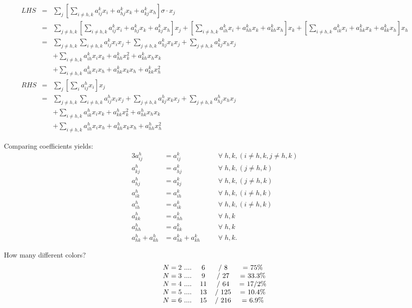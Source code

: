 \begin{eqnarray}
LHS &=& \sum_j \left[ \sum_{i \neq h,k} a^k_{ij} x_i + a^k_{hj} x_k + a^k_{kj} x_h \right] \sigma \cdot x_j \nonumber \\
&=& \sum_{j \neq h,k} \left[ \sum_{i \neq h,k} a^k_{ij} x_i + a^k_{hj} x_k + a^k_{kj} x_h \right] x_j
+ \left[ \sum_{i \neq h,k} a^k_{ih} x_i + a^k_{hh} x_k + a^k_{kh} x_h \right] x_k
+ \left[ \sum_{i \neq h,k} a^k_{ik} x_i + a^k_{hk} x_k + a^k_{kk} x_h \right] x_h \nonumber \\
&=& \sum_{j \neq h,k} \sum_{i \neq h,k} a^k_{ij} x_i x_j + \sum_{j \neq h,k} a^k_{hj} x_k x_j + \sum_{j \neq h,k} a^k_{kj} x_h x_j \nonumber \\
&& + \sum_{i \neq h,k} a^k_{ih} x_i x_k + a^k_{hh} x^2_k + a^k_{kh} x_h x_k \nonumber \\
&& + \sum_{i \neq h,k} a^k_{ik} x_i x_h + a^k_{hk} x_k x_h + a^k_{kk} x^2_h \nonumber \\
RHS &=& \sum_j \left[ \sum_i a_{ij}^h x_i \right] x_j \nonumber \\
&=& \sum_{j \neq h,k} \sum_{i \neq h,k} a^h_{ij} x_i x_j + \sum_{j \neq h,k} a^h_{kj} x_k x_j + \sum_{j \neq h,k} a^h_{hj} x_h x_j \nonumber \\
&& + \sum_{i \neq h,k} a^h_{ik} x_i x_k + a^h_{kk} x^2_k + a^h_{hk} x_h x_k \nonumber \\
&& + \sum_{i \neq h,k} a^h_{ih} x_i x_h + a^h_{kh} x_k x_h + a^h_{hh} x^2_h
\end{eqnarray}

Comparing coefficients yields:
\begin{alignat}{3}
a_{ij}^h &= a_{ij}^k && \forall \; h,k, (i \neq h,k, j \neq h,k) \nonumber \\
a_{kj}^h &= a_{hj}^k && \forall \; h,k, (j \neq h,k) \nonumber \\
a_{hj}^h &= a_{kj}^k && \forall \; h,k, (j \neq h,k) \nonumber \\
a_{ik}^h &= a_{ih}^k && \forall \; h,k, (i \neq h,k) \nonumber \\
a_{ih}^h &= a_{ik}^k && \forall \; h,k, (i \neq h,k) \nonumber \\
a_{kk}^h &= a_{hh}^k && \forall \; h,k \nonumber \\
a_{hh}^h &= a_{kk}^k && \forall \; h,k \nonumber \\
a_{hk}^h + a_{kh}^h &= a_{hk}^k + a_{kh}^k \quad && \forall \; h,k .
\end{alignat}

How many different colors?
\begin{equation}
\begin{tabular}{c c c c}
$N = 2$ .... & 6 & / 8 & = 75\% \\
$N = 3$ .... & 9 & / 27 & = 33.3\% \\
$N = 4$ .... & 11 & / 64 & = 17/2\% \\
$N = 5$ .... & 13 & / 125 & = 10.4\% \\
$N = 6$ .... & 15 & / 216 & = 6.9\%
\end{tabular}
\end{equation}

